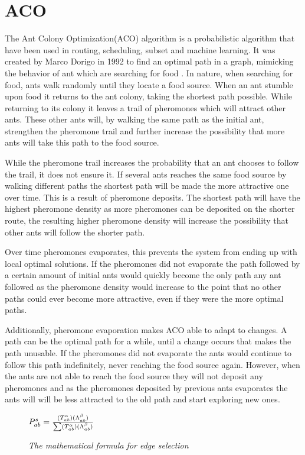 \section{ACO}
The Ant Colony Optimization(ACO) algorithm is a probabilistic algorithm that have been used in routing, scheduling, 
subset and machine learning. It was created by Marco Dorigo in 1992 to find an optimal path in a graph, mimicking the
behavior of ant which are searching for food \cite{aco}. In nature, when searching for food, ants walk randomly until
they locate a food source. When an ant stumble upon food it returns to the ant colony, taking the shortest path possible.
While returning to its colony it leaves a trail of pheromones which will attract other ants. These other ants will, by walking
the same path as the initial ant, strengthen the pheromone trail and further increase the possibility that more ants will
take this path to the food source.

While the pheromone trail increases the probability that an ant chooses to follow the trail, it does not ensure it.
If several ants reaches the same food source by walking different paths the shortest path will be made the more attractive
one over time. This is a result of pheromone deposits. The shortest path will have the highest pheromone density as more
pheromones can be deposited on the shorter route, the resulting higher pheromone density will increase the possibility that 
other ants will follow the shorter path. 

Over time pheromones evaporates, this prevents the system from ending up with local optimal solutions. 
If the pheromones did not evaporate the path followed by a certain amount of initial ants
would quickly become the only path any ant followed as the pheromone density would increase to the point that no other paths
could ever become more attractive, even if they were the more optimal paths. 

Additionally, pheromone evaporation makes ACO able to adapt to changes. A path can be the optimal path for a while, until a change
occurs that makes the path unusable. If the pheromones did not evaporate the ants would continue to follow this path indefinitely,
never reaching the food source again. However, when the ants are not able to reach the food source they will not deposit any
pheromones and as the pheromones deposited by previous ants evaporates the ants will will be less attracted to the old path
and start exploring new ones.

\begin{figure}[h]
\centering
\begin{math}
P^s_{ab} = {(T^\alpha_{ab})(\Lambda^\beta_{ab}) \over \sum (T^\alpha_{ab})(\Lambda^\beta_{ab})}
\end{math}
\caption{\textit{The mathematical formula for edge selection}}
\label{fig:edge}
\end{figure}

